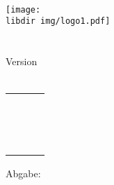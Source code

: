 \begin{titlepage}
	\begin{center}
		\vspace*{.7cm}		
		\thispagestyle{FirstPage}
		\textsc{\LARGE \fach}\\
		
		\texttt{[image: \\libdir img/logo1.pdf]}\\

		\HRule \\[0.4cm]
		{ \huge \bfseries \titel}\\[0.4cm]
		Version \version	\\
		\HRule \\[1.5cm]

		\vfill
		
		\begin{tabular}{rcl}
			\toprule
			\mgEinsVorname\ \mgEinsNachname		&&	\mgEinsMail	\\
			\mgZweiVorname\ \mgZweiNachname		&&	\mgZweiMail	\\
			\mgDreiVorname\ \mgDreiNachname		&&	\mgDreiMail	\\
			\bottomrule
		\end{tabular}
		
		\vspace{2cm}

		{\large Abgabe: \abgabe}
	\end{center}
	\addtolength{\textheight}{\versch}
\end{titlepage}